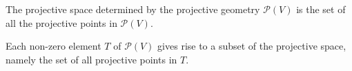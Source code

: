 The projective space determined by the projective geometry $\mathcal{P}(V)$ is the set of all the projective points in $\mathcal{P}(V)$.

Each non-zero element $T$ of $\mathcal{P}(V)$ gives rise to a subset of the projective space, namely the set of all projective points in $T$.
